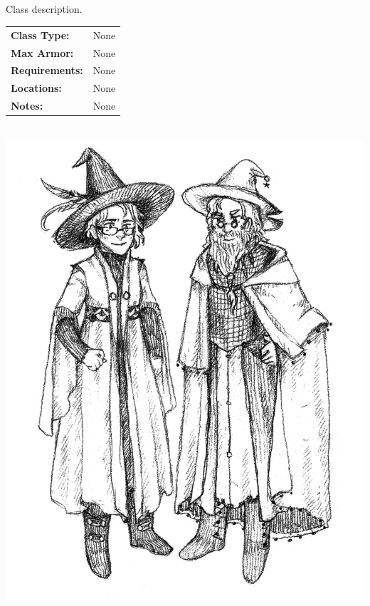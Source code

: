 \documentclass[11pt]{article}
\begin{document}
\begin{multicols}{2}

\section*{}
Class description. \\

\hspace{-0.8cm}
{
\begin{tabular}{ p{2.25cm} p{6.5cm} }
\rowcolor{gray0}
    \multicolumn{2}{c}{\textbf{Class Specs}} \\
\hline
    \textbf{Class Type:}   & None \\
    \textbf{Max Armor:}    & None \\
    \textbf{Requirements:} & None \\
    \textbf{Locations:}    & None \\
    \textbf{Notes:}        & None
\end{tabular}
} \\

\Centering
\includegraphics{images/Astengrad.jpg} \\


\end{multicols}
\end{document}
